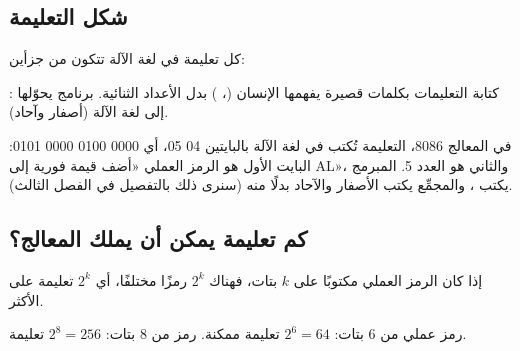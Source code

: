 \subsection{شكل التعليمة}
كل تعليمة في لغة الآلة تتكون من جزأين:

\begin{center}
\end{center}

\begin{tarif}
    : كتابة التعليمات بكلمات قصيرة
    يفهمها الإنسان (، ) بدل الأعداد الثنائية. برنامج 
    يحوّلها إلى لغة الآلة (أصفار وآحاد).
\end{tarif}

\begin{mithal}
    في المعالج \textenglish{8086}، التعليمة  تُكتب في لغة الآلة بالبايتين \textenglish{04 05}، أي
    \textenglish{0000 0100 0000 0101}: البايت الأول هو الرمز العملي «أضف قيمة فورية إلى \textenglish{AL}»، والثاني هو العدد 5.
    المبرمج يكتب ، والمجمِّع يكتب الأصفار والآحاد بدلًا منه (سنرى ذلك بالتفصيل في الفصل الثالث).
\end{mithal}

\subsection{كم تعليمة يمكن أن يملك المعالج؟}
إذا كان الرمز العملي مكتوبًا على $k$ بتات، فهناك $2^k$ رمزًا مختلفًا، أي $2^k$ تعليمة على الأكثر.

\begin{khatwa}
    رمز عملي من 6 بتات: $2^6 = 64$ تعليمة ممكنة. رمز من 8 بتات: $2^8 = 256$ تعليمة.
\end{khatwa}

